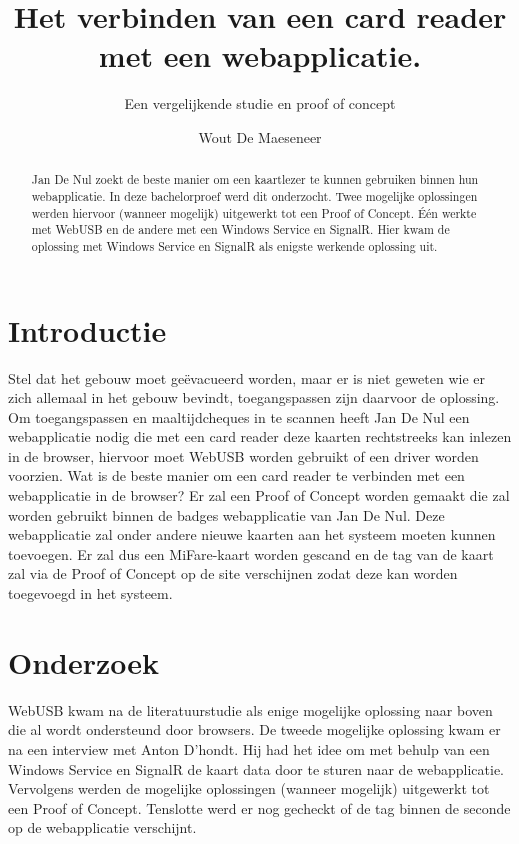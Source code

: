 \documentclass[a0,portrait]{hogent-poster}
\title{Het verbinden van een card reader met een webapplicatie.}
\subtitle{Een vergelijkende studie en proof of concept}
\author{Wout De Maeseneer}
\begin{document}
\maketitle

\begin{abstract}
Jan De Nul zoekt de beste manier om een kaartlezer te kunnen gebruiken binnen hun webapplicatie. In deze bachelorproef werd dit onderzocht. Twee mogelijke oplossingen werden hiervoor (wanneer mogelijk) uitgewerkt tot een Proof of Concept. Één werkte met WebUSB en de andere met een Windows Service en SignalR. Hier kwam de oplossing met Windows Service en SignalR als enigste werkende oplossing uit.
\end{abstract}

\begin{multicols}{2} %

\section{Introductie}

Stel dat het gebouw moet geëvacueerd worden, maar er is niet geweten wie er zich allemaal in het gebouw bevindt, toegangspassen zijn daarvoor de oplossing.
Om toegangspassen en maaltijdcheques in te scannen heeft Jan De Nul een webapplicatie nodig die met een card reader deze kaarten rechtstreeks kan inlezen in de browser, hiervoor moet WebUSB worden gebruikt of een driver worden voorzien.
Wat is de beste manier om een card reader te verbinden met een webapplicatie in de browser? 
Er zal een Proof of Concept worden gemaakt die zal worden gebruikt binnen de badges webapplicatie van Jan De Nul. Deze webapplicatie zal onder andere nieuwe kaarten aan het systeem moeten kunnen toevoegen. Er zal dus een MiFare-kaart worden gescand en de tag van de kaart zal via de Proof of Concept op de site verschijnen zodat deze kan worden toegevoegd in het systeem.

\section{Onderzoek}
WebUSB kwam na de literatuurstudie als enige mogelijke oplossing naar boven die al wordt ondersteund door browsers. De tweede mogelijke oplossing kwam er na een interview met Anton D'hondt. Hij had het idee om met behulp van een Windows Service en SignalR de kaart data door te sturen naar de webapplicatie. Vervolgens werden de mogelijke oplossingen (wanneer mogelijk) uitgewerkt tot een Proof of Concept. Tenslotte werd er nog gecheckt of de tag binnen de seconde op de webapplicatie verschijnt.


\end{multicols}
\end{document}
